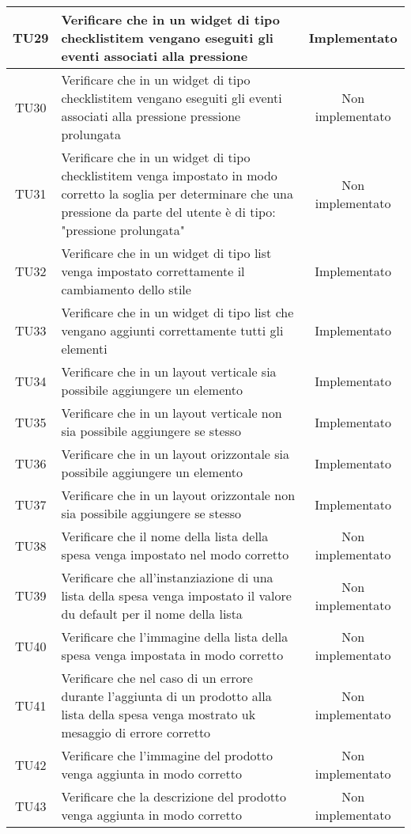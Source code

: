 \begin{center}
\begin{longtable}{|c|>{\centering}m{10cm}|c|}
		TU29 & Verificare che in un widget di tipo checklistitem vengano eseguiti gli eventi associati alla pressione & Implementato \\ \hline
		TU30 & Verificare che in un widget di tipo checklistitem vengano eseguiti gli eventi associati alla pressione pressione prolungata & Non implementato \\ \hline
		TU31 & Verificare che in un widget di tipo checklistitem venga impostato in modo corretto la soglia per determinare che una pressione da parte del utente è di tipo: "pressione prolungata" & Non implementato \\ \hline
		TU32 & Verificare che in un widget di tipo list venga impostato correttamente il cambiamento dello stile & Implementato \\ \hline
		TU33 & Verificare che in un widget di tipo list che vengano aggiunti correttamente tutti gli elementi & Implementato \\ \hline
		TU34 & Verificare che in un layout verticale sia possibile aggiungere un elemento & Implementato \\ \hline
		TU35 & Verificare che in un layout verticale non sia possibile aggiungere se stesso & Implementato \\ \hline
		TU36 & Verificare che in un layout orizzontale sia possibile aggiungere un elemento & Implementato \\ \hline
		TU37 & Verificare che in un layout orizzontale non sia possibile aggiungere se stesso & Implementato \\ \hline
		TU38 & Verificare che il nome della lista della spesa venga impostato nel modo corretto & Non implementato \\ \hline
		TU39 & Verificare che all'instanziazione di una lista della spesa venga impostato il valore du default per il nome della lista & Non implementato \\ \hline
		TU40 & Verificare che l'immagine della lista della spesa venga impostata in modo corretto & Non implementato \\ \hline
		TU41 & Verificare che nel caso di un errore durante l'aggiunta di un prodotto alla lista della spesa venga mostrato uk mesaggio di errore corretto & Non implementato \\ \hline
		TU42 & Verificare che l'immagine del prodotto venga aggiunta in modo corretto & Non implementato \\ \hline
		TU43 & Verificare che la descrizione del prodotto venga aggiunta in modo corretto & Non implementato \\ \hline

\end{longtable}
\end{center}
